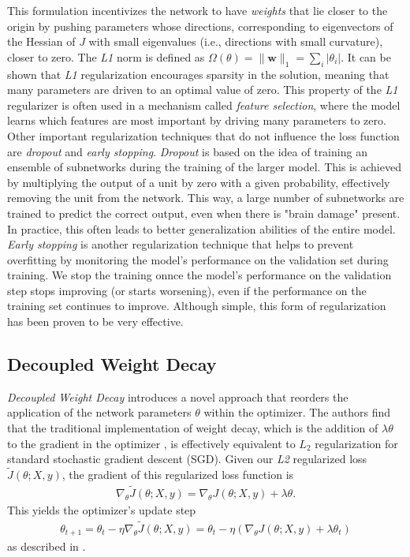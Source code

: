 This formulation incentivizes the network to have \emph{weights} that lie closer to the origin
by pushing parameters whose directions, corresponding to eigenvectors of the Hessian of $J$ with small
eigenvalues (i.e., directions with small curvature), closer to zero.
The \emph{L1} norm is defined as  \(\Omega(\theta) = \|\mathbf{w}\|_1 = \sum_i |\theta_i|\).
It can be shown that \emph{L1} regularization encourages sparsity in the solution, meaning that many parameters are driven to an optimal value of zero.
This property of the \emph{L1} regularizer is often used in a mechanism called \emph{feature selection},
where the model learns which features are most important by driving many parameters to zero. 
Other important regularization techniques that do not influence the loss function are \emph{dropout}
and \emph{early stopping}. \emph{Dropout} is based on the idea of training an ensemble of subnetworks
during the training of the larger model. This is achieved by multiplying the output of a unit 
by zero with a given probability, effectively removing the unit from the network.
This way, a large number of subnetworks are trained to predict the correct output, even when there
is "brain damage" present. In practice, this often leads to better generalization abilities of the
entire model. \emph{Early stopping} is another regularization technique that helps to prevent overfitting
by monitoring the model's performance on the validation set during training. We stop the training onnce
the model's performance on the validation step stops improving (or starts worsening), even if the performance
on the training set continues to improve. Although simple, this form of regularization has been proven to be very effective.
\cite{Goodfellow-et-al-2016}

\subsection{Decoupled Weight Decay}
\label{sec:dcp_weightdecay}

\emph{Decoupled Weight Decay} \cite{Loshchilov2017FixingWD} introduces a novel approach that reorders the application of the network parameters $\theta$ within the optimizer.
The authors find that the traditional implementation of weight decay, which is the addition of $\lambda \theta$ to the gradient in the optimizer \cite{Loshchilov2017FixingWD},
is effectively equivalent to $L_2$ regularization
for standard stochastic gradient descent (SGD). Given our \emph{L2} regularized loss $\tilde{J}(\theta; X, y)$,
the gradient of this regularized loss function is
\begin{align}
\nabla_{\theta} \tilde{J}(\theta; X, y) = \nabla_{\theta} J(\theta; X, y) + \lambda \theta.
\end{align}
This yields the optimizer's update step
\begin{align}
\theta_{t+1} = \theta_t - \eta \nabla_{\theta} \tilde{J}(\theta; X, y) = \theta_t - \eta (\nabla_{\theta} J(\theta; X, y) + \lambda \theta_t)
\end{align}
\noindent as described in \cite{DecoupledWeightDecay}.

